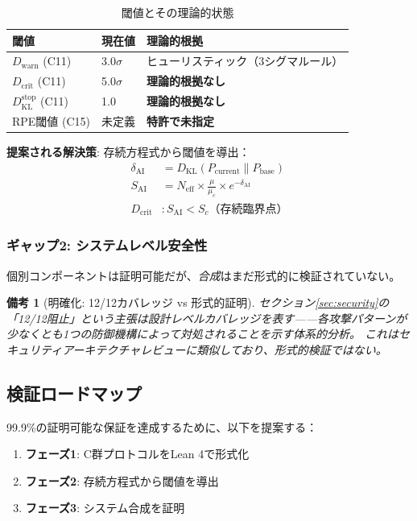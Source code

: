 \documentclass[11pt,a4paper]{article}
\newtheorem{remark}{備考}
\newcommand{\Neff}{N_{\text{eff}}}
\newcommand{\Sai}{S_{\text{AI}}}
\newcommand{\muc}{\mu_c}
\newcommand{\DKL}{D_{\text{KL}}}
\begin{document}
\begin{table}[htbp]
\centering
\caption{閾値とその理論的状態}
\label{tab:thresholds}
\begin{tabular}{@{}lll@{}}
\toprule
閾値 & 現在値 & 理論的根拠 \\
\midrule
$D_{\text{warn}}$ (C11) & 3.0$\sigma$ & ヒューリスティック（3シグマルール） \\
$D_{\text{crit}}$ (C11) & 5.0$\sigma$ & \textbf{理論的根拠なし} \\
$\DKL^{\text{stop}}$ (C11) & 1.0 & \textbf{理論的根拠なし} \\
RPE閾値 (C15) & 未定義 & \textbf{特許で未指定} \\
\bottomrule
\end{tabular}
\end{table}

\textbf{提案される解決策}: 存続方程式から閾値を導出：
\begin{align}
\delta_{\text{AI}} &= \DKL(P_{\text{current}} \| P_{\text{base}}) \\
\Sai &= \Neff \times \frac{\mu}{\muc} \times e^{-\delta_{\text{AI}}} \\
D_{\text{crit}} &: \Sai < S_c \text{（存続臨界点）}
\end{align}

\subsubsection{ギャップ2: システムレベル安全性}

個別コンポーネントは証明可能だが、\emph{合成}はまだ形式的に検証されていない。

\begin{remark}[明確化: 12/12カバレッジ vs 形式的証明]
セクション\ref{sec:security}の「12/12阻止」という主張は\emph{設計レベルカバレッジ}を表す——各攻撃パターンが少なくとも1つの防御機構によって対処されることを示す体系的分析。
これはセキュリティアーキテクチャレビューに類似しており、形式的検証ではない。
\end{remark}

\subsection{検証ロードマップ}

99.9\%の証明可能な保証を達成するために、以下を提案する：

\begin{enumerate}
    \item \textbf{フェーズ1}: C群プロトコルをLean 4で形式化
    \item \textbf{フェーズ2}: 存続方程式から閾値を導出
    \item \textbf{フェーズ3}: システム合成を証明
\end{enumerate}
\end{document}
